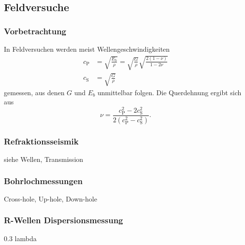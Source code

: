 \subsection{Feldversuche}


\begin{frame}
\frametitle{Vorbetrachtung}
In Feldversuchen werden meist Wellengeschwindigkeiten 
\begin{align*}
 c_\mathrm{P} &= \sqrt{\frac{E_\mathrm{b}}{\rho}} 
 = \sqrt{\frac{G}{\rho}}\sqrt{\frac{2(1-\nu)}{1-2\nu}} \\
 c_\mathrm{S} &= \sqrt{\frac{G}{\rho}} 
\end{align*}
gemessen, aus denen $G$ und $E_b$ unmittelbar folgen.
Die Querdehnung ergibt sich aus
\begin{equation*}
\nu = \frac{c_\mathrm{P}^2 - 2c_\mathrm{S}^2}{2(c_\mathrm{P}^2-c_\mathrm{S}^2)}  .
\end{equation*}
\end{frame}


\begin{frame}
\frametitle{Refraktionsseismik}
siehe Wellen, Transmission

\end{frame}


\begin{frame}
\frametitle{Bohrlochmessungen}

Cross-hole, Up-hole, Down-hole
\end{frame}


\begin{frame}
\frametitle{R-Wellen Dispersionsmessung}
0.3 lambda

\end{frame}
